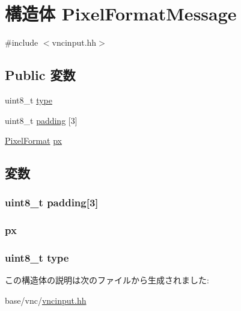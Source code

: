 \hypertarget{structVncInput_1_1PixelFormatMessage}{
\section{構造体 PixelFormatMessage}
\label{structVncInput_1_1PixelFormatMessage}
}


{\ttfamily \#include $<$vncinput.hh$>$}\subsection*{Public 変数}
\begin{DoxyCompactItemize}
\item 
uint8\_\-t \hyperlink{structVncInput_1_1PixelFormatMessage_a1d127017fb298b889f4ba24752d08b8e}{type}
\item 
uint8\_\-t \hyperlink{structVncInput_1_1PixelFormatMessage_a735ef00341a84c02ba561c66de3d20af}{padding} \mbox{[}3\mbox{]}
\item 
\hyperlink{structVncInput_1_1PixelFormat}{PixelFormat} \hyperlink{structVncInput_1_1PixelFormatMessage_a07ef974d3a4dd48ea4b0b1decc3732e2}{px}
\end{DoxyCompactItemize}


\subsection{変数}
\hypertarget{structVncInput_1_1PixelFormatMessage_a735ef00341a84c02ba561c66de3d20af}{
\subsubsection[{padding}]{\setlength{\rightskip}{0pt plus 5cm}uint8\_\-t {\bf padding}\mbox{[}3\mbox{]}}}
\label{structVncInput_1_1PixelFormatMessage_a735ef00341a84c02ba561c66de3d20af}
\hypertarget{structVncInput_1_1PixelFormatMessage_a07ef974d3a4dd48ea4b0b1decc3732e2}{
\subsubsection[{px}]{ {\bf px}}}
\label{structVncInput_1_1PixelFormatMessage_a07ef974d3a4dd48ea4b0b1decc3732e2}
\hypertarget{structVncInput_1_1PixelFormatMessage_a1d127017fb298b889f4ba24752d08b8e}{
\subsubsection[{type}]{\setlength{\rightskip}{0pt plus 5cm}uint8\_\-t {\bf type}}}
\label{structVncInput_1_1PixelFormatMessage_a1d127017fb298b889f4ba24752d08b8e}


この構造体の説明は次のファイルから生成されました:\begin{DoxyCompactItemize}
\item 
base/vnc/\hyperlink{vncinput_8hh}{vncinput.hh}\end{DoxyCompactItemize}
